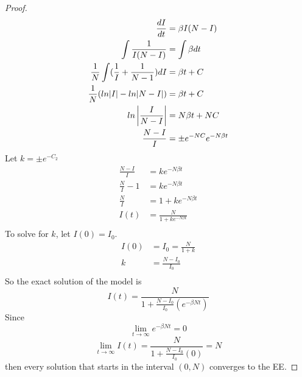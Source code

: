 \begin{proof}
    \begin{align*}
        \frac{dI}{dt}                                   &= \beta I(N-I)\\
        \int\frac{1}{I(N-I)}                            &= \int\beta dt\\
        \frac{1}{N}\int (\frac{1}{I} + \frac{1}{N-1})dI &= \beta t + C\\
        \frac{1}{N}(ln|I|- ln|N-I|)                     &= \beta t + C\\
        ln\left|\frac{I}{N-I}\right|                           &= N \beta t + NC\\
        \frac{N-I}{I}                                   &= \pm e^{-NC}e^{-N\beta t}\\
    \end{align*}
    Let $k = \pm e^{-C_2}$\\
    \begin{align*}
        \frac{N-I}{I} 	  &= ke^{-N\beta t}\\
        \frac{N}{I} - 1   &= ke^{-N\beta t}\\
        \frac{N}{I} 	  &= 1 + ke^{-N\beta t}\\
        I(t) 			   &= \frac{N}{1 + ke^{-N\beta t}}\\
    \end{align*}
    To solve for $k$, let $I(0) = I_0$.\\
    \begin{align*}
        I(0) 	&= I_0 = \frac{N}{1 + k}\\
        k 		&= \frac{N - I_0}{I_0}\\
    \end{align*}
    So the exact solution of the model is
    \begin{equation}
        I(t) =  \frac{N}{1+\frac{N-I_0}{I_0}(e^{-\beta N t})}
    \end{equation}
    Since
    $$\lim_{t\to\infty} e^{-\beta N t} = 0$$
    $$\lim_{t\to\infty} I(t) = \frac{N}{1 +\frac{N-I_0}{I_0}(0)} = N$$
    then every solution that starts in the interval $(0, N)$ converges to the EE.
\end{proof}
